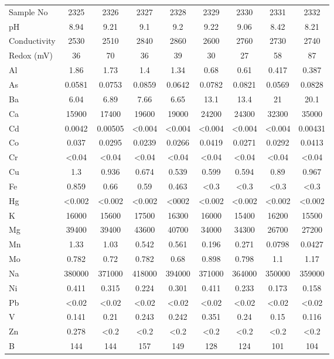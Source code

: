 \documentclass[algorithms,article,submit,pdftex,moreauthors]{Definitions/mdpi}
\begin{document}
\begin{scriptsize}
\begin{center}
\begin{longtable}{@{\extracolsep{\fill}}|p{1.8cm}|cccccccc|@{}}
\hline \hline
\endlastfoot

Sample No & 2325 & 2326 & 2327 & 2328 & 2329 & 2330 & 2331 & 2332 \\
pH & 8.94 & 9.21 & 9.1 & 9.2 & 9.22 & 9.06 & 8.42 & 8.21 \\
Conductivity & 2530 & 2510 & 2840 & 2860 & 2600 & 2760 & 2730 & 2740 \\
Redox (mV) & 36 & 70 & 36 & 39 & 30 & 27 & 58 & 87 \\
Al & 1.86 & 1.73 & 1.4 & 1.34 & 0.68 & 0.61 & 0.417 & 0.387 \\
As & 0.0581 & 0.0753 & 0.0859 & 0.0642 & 0.0782 & 0.0821 & 0.0569 & 0.0828 \\
Ba & 6.04 & 6.89 & 7.66 & 6.65 & 13.1 & 13.4 & 21 & 20.1 \\
Ca & 15900 & 17400 & 19600 & 19000 & 24200 & 24300 & 32300 & 35000 \\
Cd & 0.0042 & 0.00505 & <0.004 & <0.004 & <0.004 & <0.004 & <0.004 & 0.00431 \\
Co & 0.037 & 0.0295 & 0.0239 & 0.0266 & 0.0419 & 0.0271 & 0.0292 & 0.0413 \\
Cr & <0.04 & <0.04 & <0.04 & <0.04 & <0.04 & <0.04 & <0.04 & <0.04  \\
Cu & 1.3 & 0.936 & 0.674 & 0.539 & 0.599 & 0.594 & 0.89 & 0.967 \\
Fe & 0.859 & 0.66 & 0.59 & 0.463 & <0.3 & <0.3 & <0.3 & <0.3 \\
Hg & <0.002 & <0.002 & <0.002 & <0002 & <0.002 & <0.002 & <0.002 & <0.002 \\
K & 16000 & 15600 & 17500 & 16300 & 16000 & 15400 & 16200 & 15500 \\
Mg & 39400 & 39400 & 43600 & 40700 & 34000 & 34300 & 26700 & 27200 \\
Mn & 1.33 & 1.03 & 0.542 & 0.561 & 0.196 & 0.271 & 0.0798 & 0.0427 \\
Mo & 0.782 & 0.72 & 0.782 & 0.68 & 0.898 & 0.798 & 1.1 & 1.17 \\
Na & 380000 & 371000 & 418000 & 394000 & 371000 & 364000 & 350000 & 359000 \\
Ni & 0.411 & 0.315 & 0.224 & 0.301 & 0.411 & 0.233 & 0.173 & 0.158 \\
Pb & <0.02 & <0.02 & <0.02 & <0.02 & <0.02 & <0.02 & <0.02 & <0.02 \\
V & 0.141 & 0.21 & 0.243 & 0.242 & 0.351 & 0.24 & 0.15 & 0.116 \\
Zn & 0.278 & <0.2 & <0.2 & <0.2 & <0.2 & <0.2 & <0.2 & <0.2 \\
B & 144 & 144 & 157 & 149 & 128 & 124 & 101 & 104 \\

\end{longtable}
\end{center}
\end{scriptsize}
\end{document}

